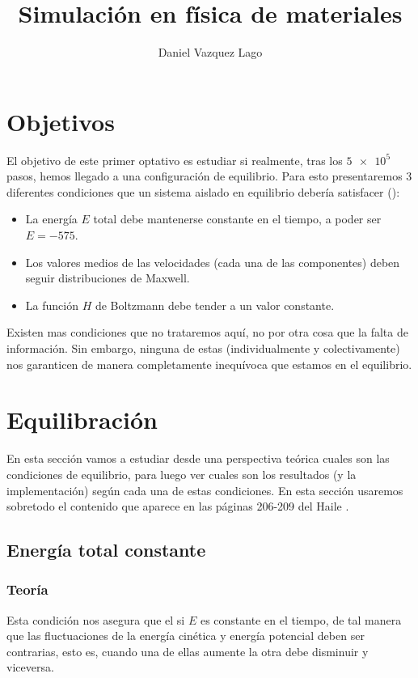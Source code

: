 \documentclass[11pt]{article} %
\author{Daniel Vazquez Lago}
\title{Simulación en física de materiales}
\begin{document}
	
	
\maketitle
\newpage
\tableofcontents
\section{Objetivos}
	
El objetivo de este primer optativo es estudiar si realmente, tras los $\num{5e5}$ pasos, hemos llegado a una configuración de equilibrio. Para esto presentaremos 3 diferentes condiciones que un sistema aislado en equilibrio debería satisfacer (\cite{Haile}):

\begin{itemize}
 	\item La energía $E$ total debe mantenerse constante en el tiempo, a poder ser $E=-575$.
 	\item Los valores medios de las velocidades (cada una de las componentes) deben seguir distribuciones de Maxwell.
 	\item La función $H$ de Boltzmann debe tender a un valor constante. 	
\end{itemize}
Existen mas condiciones que no trataremos aquí, no por otra cosa que la falta de información. Sin embargo, ninguna de estas (individualmente y colectivamente) nos garanticen de manera completamente inequívoca que estamos en el equilibrio.
	
\section{Equilibración}

En esta sección vamos a estudiar desde una perspectiva teórica cuales son las condiciones de equilibrio, para luego ver cuales son los resultados (y la implementación) según cada una de estas condiciones. En esta sección usaremos sobretodo el contenido que aparece en las páginas 206-209 del Haile \cite{Haile}. 

\subsection{Energía total constante}

\subsubsection{Teoría}

Esta condición nos asegura que el si $E$ es constante en el tiempo, de tal manera que las fluctuaciones de la energía cinética y energía potencial deben ser contrarias, esto es, cuando una de ellas aumente la otra debe disminuir y viceversa. 
\end{document}
